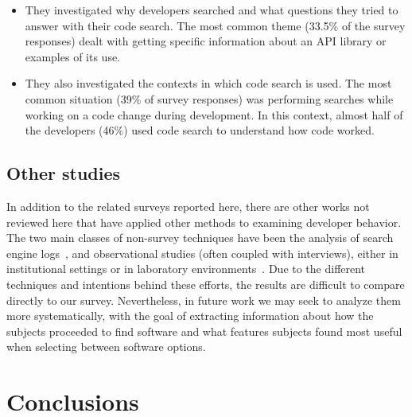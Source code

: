 \documentclass{casicswhitepaper}
\begin{document}
\begin{itemize}

\item They investigated why developers searched and what questions they tried to answer with their code search.  The most common theme (33.5\% of the survey responses) dealt with getting specific information about an API library or examples of its use.

\item They also investigated the contexts in which code search is used.  The most common situation (39\% of survey responses) was performing searches while working on a code change during development.  In this context, almost half of the developers (46\%) used code search to understand how code worked.

\end{itemize}


\subsection{Other studies}

In addition to the related surveys reported here, there are other works not reviewed here that have applied other methods to examining developer behavior.  The two main classes of non-survey techniques have been the analysis of search engine logs~\cite{bajrachary_2009, bajracharya2012analyzing, jansen_2006, teevan_2004, brandt2009two, brandt2010example, Li2009751, ge2014developers, volske2015users}, and observational studies (often coupled with interviews), either in institutional settings or in laboratory environments~\cite{sim_2011, brandt2009two, banker1993repository, gallardo2013software, sherif2003barriers, pohthong2001reuse, sim2013controlled, murphyhill2015how, sim2011getting, dabbish_2012}.  Due to the different techniques and intentions behind these efforts, the results are difficult to compare directly to our survey.  Nevertheless, in future work we may seek to analyze them more systematically, with the goal of extracting information about how the subjects proceeded to find software and what features subjects found most useful when selecting between software options.


\section{Conclusions}
\end{document}
